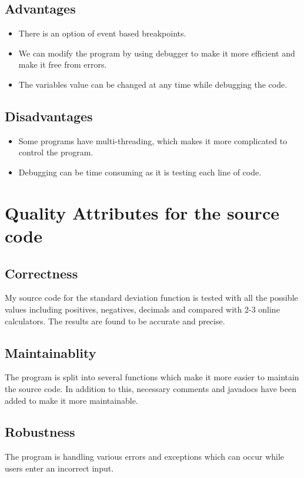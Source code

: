 \documentclass[12pt,letterpaper]{report}
\begin{document}
\section{Advantages}

\begin{itemize}
    \item There is an option of event based breakpoints.
    \item We can modify the program by using debugger to make it more efficient and make it free from errors.
    \item The variables value can be changed at any time while debugging the code.

\end{itemize}

\section{Disadvantages}
\begin{itemize}
    \item Some programs have multi-threading, which makes it more complicated to control the program.
    \item Debugging can be time consuming as it is testing each line of code.
\end{itemize}

{\let\clearpage\relax \chapter{Quality Attributes for the source code }}


\section{Correctness}
My source code for the standard deviation function is tested with all the possible values including positives, negatives, decimals and compared with 2-3 online calculators. The results are found to be accurate and precise. 

\section{Maintainablity}
The program is split into several functions which make it more easier to maintain the source code. In addition to this, necessary comments and javadocs have been added to make it more maintainable.

\section{Robustness}
The program is handling various errors and exceptions which can occur while users enter an incorrect input. 
\end{document}
